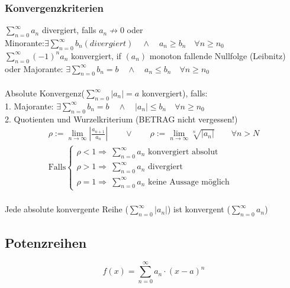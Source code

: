 \documentclass[6pt,a4paper]{scrartcl}
\newcommand{\abs}[1]{\ensuremath{\left\vert#1\right\vert}}
\newcommand{\Ra}[0]{\ensuremath{\Rightarrow}}
\begin{document}
\begin{multicols*}{4}
\subsubsection{Konvergenzkriterien}
$\sum^{\infty}_{n = 0} a_n$ divergiert, falls $a_n \not \rightarrow 0$ oder\\
Minorante:$\exists \sum^{\infty}_{n = 0} b_n (divergiert) \quad \land \quad a_n \ge b_n \quad \forall n\ge n_0$\\[0.6em] 
$\sum^{\infty}_{n = 0}(-1)^n a_n$ konvergiert, if $(a_n)$ monoton fallende Nullfolge (Leibnitz)\\
oder Majorante: $\exists \sum^{\infty}_{n = 0} b_n = b \quad \land \quad a_n \le b_n \quad \forall n\ge n_0$\\
\\
Absolute Konvergenz($\sum^\infty_{n=0} |a_n|=a$ konvergiert), falls:\\
1. Majorante: $\exists \sum^{\infty}_{n = 0} b_n = b \quad \land \quad |a_n| \le b_n \quad \forall n\ge n_0$\\
2. Quotienten und Wurzelkriterium (BETRAG nicht vergessen!)
\begin{eqnarray*}
	\rho := \lim_{n \rightarrow \infty} \abs{\frac{a_{n+1}}{a_n}} \qquad \lor \qquad \rho := \lim_{n \rightarrow \infty} \sqrt[n]{\abs{a_n}} \qquad \forall n > N\\
	\text{Falls} 
	\begin{cases}
		\rho < 1 \Ra  ~\sum^\infty_{n=0} a_n \text{ konvergiert absolut} \\
		\rho > 1 \Ra  ~\sum^\infty_{n=0} a_n \text{ divergiert} \\
		\rho = 1 \Ra  ~\sum^\infty_{n=0} a_n \text{ keine Aussage möglich}
	\end{cases}
\end{eqnarray*}
\\
Jede absolute konvergente Reihe ($\sum^\infty_{n=0} |a_n|$) ist konvergent ($\sum^\infty_{n=0} a_n$)


\subsection{Potenzreihen} %
\begin{equation*}
f(x)=\sum_{n=0}^\infty a_n \cdot (x-a)^n
\end{equation*}

\end{multicols*}
\end{document}

